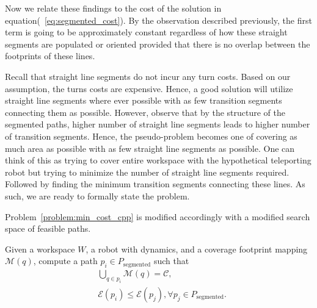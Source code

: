 \documentclass[../main.tex]{subfiles}
\begin{document}
Now we relate these findings to the cost of the solution in equation(~\ref{eq:segmented_cost}). By the observation described previously, the first term is going to be approximately constant regardless of how these straight segments are populated or oriented provided that there is no overlap between the footprints of these lines.

Recall that straight line segments do not incur any turn costs. Based on our assumption, the turns costs are expensive. Hence, a good solution will utilize straight line segments where ever possible with as few transition segments connecting them as possible. However, observe that by the structure of the segmented paths, higher number of straight line segments leads to higher number of transition segments. Hence, the pseudo-problem becomes one of covering as much area as possible with as few straight line segments as possible. One can think of this as trying to cover entire workspace with the hypothetical teleporting robot but trying to minimize the number of straight line segments required. Followed by finding the minimum transition segments connecting these lines. As such, we are ready to formally state the problem.

Problem~\ref{problem:min_cost_cpp} is modified accordingly with a modified search space of feasible paths.
\begin{problem}
\label{problem:min_cost_cpp_with_lines}
	Given a workspace $W$, a robot with dynamics, and a coverage footprint mapping $\mathcal{M}(q)$, compute a path $p_i\in P_{\text{segmented}}$ such that
	\begin{equation}
	\label{condition:full_coverage_2}
	\begin{aligned}
		& \bigcup_{q\in p_i}\mathcal{M}(q)=\mathcal{C},\\
		& \mathcal{E}(p_i)\leq\mathcal{E}(p_j), \forall p_j\in P_{\text{segmented}}.
	\end{aligned}
	\end{equation}
\end{problem}

\end{document}
